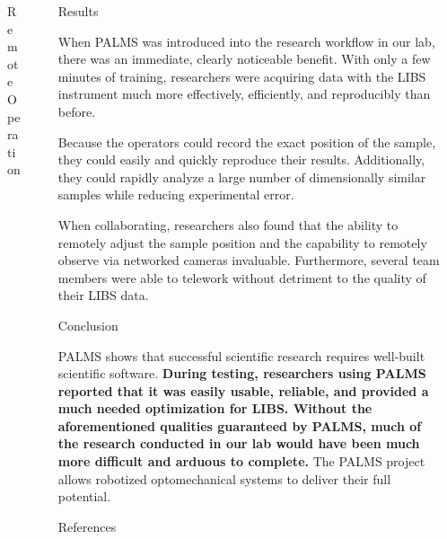 \documentclass[final, aspectratio=158]{beamer}
\newlength{\sepwidth}
\newlength{\colwidth}
\newcommand{\separatorcolumn}{\begin{column}{\sepwidth}\end{column}}
\begin{document}
\begin{frame}[t]
\begin{columns}[t]
\begin{column}{\colwidth}
\begin{block}{Remote Operation}
  \end{block}
  
\end{column}

\separatorcolumn

\begin{column}{\colwidth}

  \begin{block}{Results}

    When PALMS was introduced into the research workflow in our lab, there was an immediate, clearly noticeable benefit.
    With only a few minutes of training, researchers were acquiring data with the LIBS instrument much more 
    effectively, efficiently, and reproducibly than before.
    
    Because the operators could record the exact position of the sample, they could easily and quickly reproduce their results.
    Additionally, they could rapidly analyze a large number of dimensionally similar samples while reducing experimental error.

    When collaborating, researchers also found that the ability to remotely adjust the sample position 
    and the capability to remotely observe via networked cameras invaluable.
    Furthermore, several team members were able to telework without detriment to the quality of their LIBS data.

  \end{block}

  \begin{block}{Conclusion}

    PALMS shows that successful scientific research requires well-built scientific software.
    \textbf{During testing, researchers using PALMS reported that it was 
    easily usable, 
    reliable, 
    and provided a much needed optimization for LIBS.
    Without the aforementioned qualities guaranteed by PALMS, 
    much of the research conducted in our lab would have been much more difficult and arduous to complete.}
    The PALMS project allows robotized optomechanical systems to deliver their full potential.

  \end{block}

  \begin{block}{References}

    \nocite{*}
    \footnotesize{}

  \end{block}

\end{column}

\separatorcolumn
\end{columns}
\end{frame}
\end{document}
